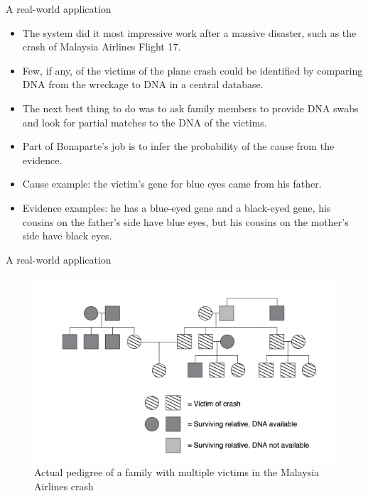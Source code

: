 \documentclass[handout]{beamer}
\begin{document}
\begin{frame}{A real-world application}
\scriptsize{
\begin{itemize}

\item The system did it most impressive work after a massive disaster, such as the crash of Malaysia Airlines Flight 17.

\item Few, if any, of the victims of the plane crash could be identified by comparing DNA from the wreckage to DNA in a central database. 

\item The next best thing to do was to ask family members to provide DNA swabs and look for partial matches to the DNA of the victims.

\item Part of Bonaparte's job is to infer the probability of the cause from the evidence. 

\item Cause example: the victim's gene for blue eyes came from his father.

\item Evidence examples: he has a blue-eyed gene and a black-eyed gene, his cousins on the father's side have blue eyes, but his cousins on the mother’s side have black eyes. 
 
\end{itemize}



} 

\end{frame}



\begin{frame}{A real-world application}

\begin{figure}[h!]
	\centering
	\includegraphics[scale=0.45]{pics/malasyia.png}
	\caption{Actual pedigree of a family with multiple victims in the Malaysia Airlines crash \cite{pearl2018book}}
	\end{figure} 

\end{frame}
\end{document}
